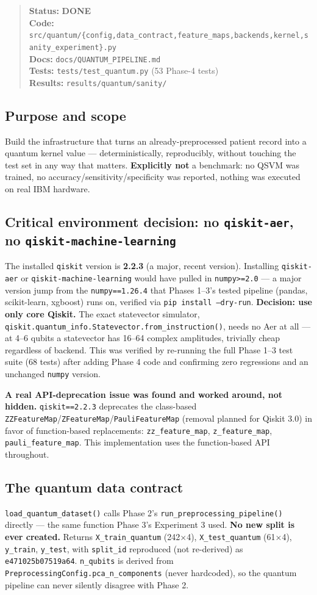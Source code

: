 \documentclass[11pt,a4paper]{article}
\newcommand{\code}[1]{\texttt{\small #1}}
\newcommand{\done}{\textcolor{donecolor}{\textbf{DONE}}}
\newcommand{\phasestatus}[5]{%
\begin{quote}\small\raggedright
\textbf{Status:} #1 \\
\textbf{Code:} #2 \\
\textbf{Docs:} #3 \\
\textbf{Tests:} #4 \\
\textbf{Results:} #5
\end{quote}}
\begin{document}
\phasestatus{\done}{\code{src/quantum/\{config,data\_contract,feature\_maps,backends,kernel,sanity\_experiment\}.py}}{\code{docs/QUANTUM\_PIPELINE.md}}{\code{tests/test\_quantum.py} (53 Phase-4 tests)}{\code{results/quantum/sanity/}}

\subsection{Purpose and scope}
Build the infrastructure that turns an already-preprocessed patient record into a quantum kernel value --- deterministically, reproducibly, without touching the test set in any way that matters. \textbf{Explicitly not} a benchmark: no QSVM was trained, no accuracy/sensitivity/specificity was reported, nothing was executed on real IBM hardware.

\subsection{Critical environment decision: no \code{qiskit-aer}, no \code{qiskit-machine-learning}}
The installed \code{qiskit} version is \textbf{2.2.3} (a major, recent version). Installing \code{qiskit-aer} or \code{qiskit-machine-learning} would have pulled in \code{numpy>=2.0} --- a major version jump from the \code{numpy==1.26.4} that Phases 1--3's tested pipeline (pandas, scikit-learn, xgboost) runs on, verified via \code{pip install --dry-run}. \textbf{Decision: use only core Qiskit.} The exact statevector simulator, \code{qiskit.quantum\_info.Statevector.from\_instruction()}, needs no Aer at all --- at 4--6 qubits a statevector has 16--64 complex amplitudes, trivially cheap regardless of backend. This was verified by re-running the full Phase 1--3 test suite (68 tests) after adding Phase 4 code and confirming zero regressions and an unchanged \code{numpy} version.

\textbf{A real API-deprecation issue was found and worked around, not hidden.} \code{qiskit==2.2.3} deprecates the class-based \code{ZZFeatureMap}/\code{ZFeatureMap}/\code{PauliFeatureMap} (removal planned for Qiskit 3.0) in favor of function-based replacements: \code{zz\_feature\_map}, \code{z\_feature\_map}, \code{pauli\_feature\_map}. This implementation uses the function-based API throughout.

\subsection{The quantum data contract}
\code{load\_quantum\_dataset()} calls Phase 2's \code{run\_preprocessing\_pipeline()} directly --- the same function Phase 3's Experiment 3 used. \textbf{No new split is ever created.} Returns \code{X\_train\_quantum} (242$\times$4), \code{X\_test\_quantum} (61$\times$4), \code{y\_train}, \code{y\_test}, with \code{split\_id} reproduced (not re-derived) as \code{e471025b07519a64}. \code{n\_qubits} is derived from \code{PreprocessingConfig.pca\_n\_components} (never hardcoded), so the quantum pipeline can never silently disagree with Phase 2.
\end{document}
